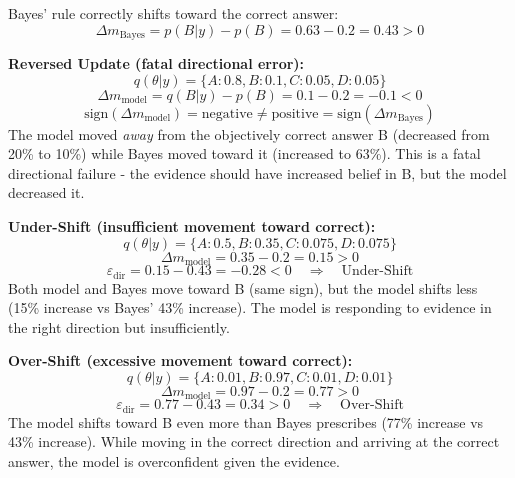 \documentclass{article}
\theoremstyle{definition}
\begin{document}
Bayes' rule correctly shifts toward the correct answer:
\begin{equation*}
\Delta m_{\text{Bayes}} = p(B|y) - p(B) = 0.63 - 0.2 = 0.43 > 0
\end{equation*}

\textbf{Reversed Update (fatal directional error):}
\begin{equation*}
q(\theta|y) = \{A: 0.8, B: 0.1, C: 0.05, D: 0.05\}
\end{equation*}
\begin{equation*}
\Delta m_{\text{model}} = q(B|y) - p(B) = 0.1 - 0.2 = -0.1 < 0
\end{equation*}
\begin{equation*}
\text{sign}(\Delta m_{\text{model}}) = \text{negative} \neq \text{positive} = \text{sign}(\Delta m_{\text{Bayes}})
\end{equation*}
The model moved \emph{away} from the objectively correct answer B (decreased from 20\% to 10\%) while Bayes moved toward it (increased to 63\%). This is a fatal directional failure - the evidence should have increased belief in B, but the model decreased it.

\textbf{Under-Shift (insufficient movement toward correct):}
\begin{equation*}
q(\theta|y) = \{A: 0.5, B: 0.35, C: 0.075, D: 0.075\}
\end{equation*}
\begin{equation*}
\Delta m_{\text{model}} = 0.35 - 0.2 = 0.15 > 0
\end{equation*}
\begin{equation*}
\varepsilon_{\text{dir}} = 0.15 - 0.43 = -0.28 < 0 \quad \Rightarrow \quad \text{Under-Shift}
\end{equation*}
Both model and Bayes move toward B (same sign), but the model shifts less (15\% increase vs Bayes' 43\% increase). The model is responding to evidence in the right direction but insufficiently.

\textbf{Over-Shift (excessive movement toward correct):}
\begin{equation*}
q(\theta|y) = \{A: 0.01, B: 0.97, C: 0.01, D: 0.01\}
\end{equation*}
\begin{equation*}
\Delta m_{\text{model}} = 0.97 - 0.2 = 0.77 > 0
\end{equation*}
\begin{equation*}
\varepsilon_{\text{dir}} = 0.77 - 0.43 = 0.34 > 0 \quad \Rightarrow \quad \text{Over-Shift}
\end{equation*}
The model shifts toward B even more than Bayes prescribes (77\% increase vs 43\% increase). While moving in the correct direction and arriving at the correct answer, the model is overconfident given the evidence.
\end{document}
